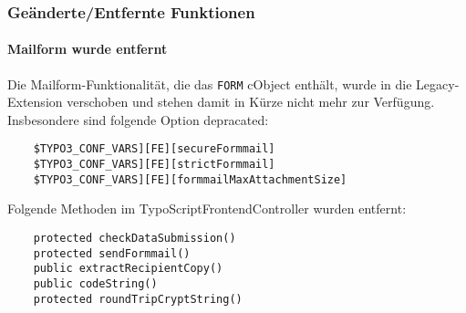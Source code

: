 
\begin{frame}[fragile]
	\frametitle{Geänderte/Entfernte Funktionen}
	\framesubtitle{Mailform wurde entfernt}

	Die Mailform-Funktionalität, die das \texttt{FORM} cObject enthält, wurde in die Legacy-Extension  verschoben und stehen damit in Kürze nicht mehr zur Verfügung. Insbesondere sind folgende Option depracated:

	\begin{lstlisting}
	$TYPO3_CONF_VARS][FE][secureFormmail]
	$TYPO3_CONF_VARS][FE][strictFormmail]
	$TYPO3_CONF_VARS][FE][formmailMaxAttachmentSize]
	\end{lstlisting}

	Folgende Methoden im TypoScriptFrontendController wurden entfernt:

	\begin{lstlisting}
	protected checkDataSubmission()
	protected sendFormmail()
	public extractRecipientCopy()
	public codeString()
	protected roundTripCryptString()
	\end{lstlisting}

\end{frame}


